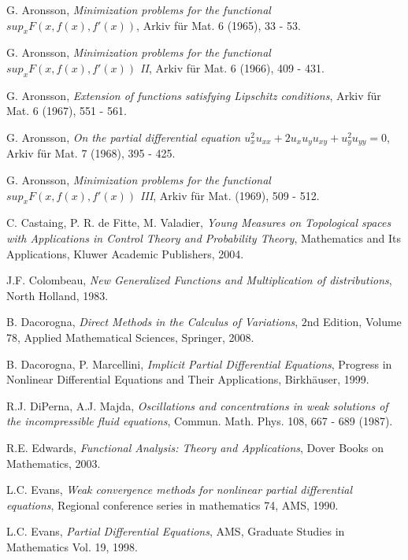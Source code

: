 \documentclass{amsart}
\theoremstyle{definition}
\numberwithin{equation}{section}
\begin{document}

\begin{thebibliography}{30}

 G. Aronsson, \emph{Minimization problems for the functional $sup_x F(x,
f(x), f'(x))$}, Arkiv f\"ur Mat. 6 (1965), 33 - 53.

 G. Aronsson, \emph{Minimization problems for the functional $sup_x F(x,
f(x), f'(x))$ II}, Arkiv f\"ur Mat. 6 (1966), 409 - 431.

 G. Aronsson, \emph{Extension of functions satisfying Lipschitz conditions}, Arkiv f\"ur Mat. 6 (1967), 551 - 561.

 G. Aronsson, \emph{On the partial differential equation $u_x^2 u_{xx} + 2u_x u_y u_{xy} + u_y^2 u_{yy} = 0$}, Arkiv f\"ur Mat. 7
(1968), 395 - 425.

 G. Aronsson, \emph{Minimization problems for the functional $sup_x F(x,
f(x), f'(x))$ III}, Arkiv f\"ur Mat. (1969), 509 - 512.

 C. Castaing, P. R. de Fitte, M. Valadier, \emph{Young Measures on Topological spaces with Applications in Control Theory and Probability Theory}, Mathematics and Its Applications, Kluwer Academic Publishers, 2004.

 J.F. Colombeau, \emph{New Generalized Functions and Multiplication of distributions}, North Holland, 1983.

 B. Dacorogna,  \emph{Direct Methods in the Calculus of Variations}, $2$nd Edition, Volume 78, Applied Mathematical Sciences, Springer, 2008.

 B. Dacorogna,  P. Marcellini, \emph{Implicit Partial Differential Equations}, Progress in Nonlinear Differential Equations and Their Applications, Birkh\"auser, 1999.

 R.J. DiPerna, A.J. Majda,  \emph{Oscillations and concentrations in weak solutions of the incompressible fluid equations}, Commun. Math. Phys. 108, 667 - 689 (1987).

 R.E. Edwards, \emph{Functional Analysis: Theory and Applications}, Dover Books on Mathematics,  2003.

 L.C. Evans, \emph{Weak convergence methods for nonlinear partial differential equations}, Regional conference series in mathematics 74, AMS,  1990.

 L.C. Evans, \emph{Partial Differential Equations}, AMS, Graduate Studies in Mathematics Vol. 19, 1998.


\end{thebibliography}
\end{document}

